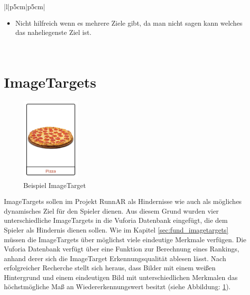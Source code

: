 \begin{table}[H]
{\begin{tabular}{|l|p{5cm}|p{5cm}|}
          \begin{minipage}{\linewidth}
            \vspace{0.1cm}
            \begin{itemize}
                \item Nicht hilfreich wenn es mehrere Ziele gibt, da man nicht sagen kann welches das naheliegenste Ziel ist.
            \end{itemize}
            \vspace{0.1cm}
        \end{minipage}                    \\ \hline
        \end{tabular}%
    }
    \caption{Vergleich A* und Dijkstra }
    \label{tbl:comparisonA*Dijkstra}
\end{table}

\section{ImageTargets}
\label{sec:rec_imageTargets}
\begin{figure}
	\includegraphics[width=3cm]{assets/exampleImageTarget.jpg}
	\caption{Beispiel ImageTarget}
	\label{fig:exampleImageTarget}
\end{figure}
ImageTargets sollen im Projekt RunnAR als Hindernisse wie auch als mögliches dynamisches Ziel für den Spieler dienen. Aus diesem Grund wurden vier unterschiedliche ImageTargets in die Vuforia Datenbank eingefügt, die dem Spieler als Hindernis dienen sollen. Wie im Kapitel \ref{sec:fund_imagetargets}  müssen die ImageTargets über möglichst viele eindeutige Merkmale verfügen. Die Vuforia Datenbank verfügt über eine Funktion zur Berechnung eines Rankings, anhand derer sich die ImageTarget Erkennungsqualität ablesen lässt. Nach erfolgreicher Recherche stellt sich heraus, dass Bilder mit einem weißen Hintergrund und einem eindeutigen Bild mit unterschiedlichen Merkmalen das höchstmögliche Maß an Wiedererkennungswert besitzt (siehe Abbildung: \ref{fig:exampleImageTarget}).

